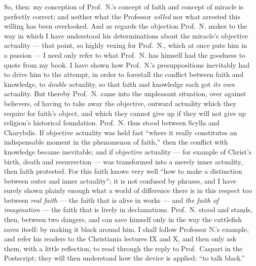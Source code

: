 \documentclass[12pt,a4paper]{book}
\begin{document}
So, then: my conception of Prof.\ N.'s concept of faith and concept of miracle
is perfectly correct; and neither what the Professor \emph{willed} nor what
arrested this willing has been overlooked. And as regards the objection Prof.\
N. makes to the way in which I have understood his determinations about the
miracle's objective actuality --- that point, so highly vexing for Prof.\ N.,
which at once puts him in a passion --- I need only refer to what Prof.\ N. has
himself had the goodness to quote from my book. I have shown how Prof.\ N.'s
presuppositions inevitably had to drive him to the attempt, in order to
forestall the conflict between faith and knowledge, to \emph{double} actuality,
so that faith and knowledge each got \emph{its own} actuality. But thereby
Prof.\ N. came into the unpleasant situation, over against believers, of having
to take away the objective, outward actuality which they require for faith's
object, and which they cannot give up if they will not give up religion's
historical foundation. Prof.\ N. thus stood between Scylla and Charybdis. If
objective actuality was held fast ``where it really constitutes an
indispensable moment in the phenomenon of faith,'' then the conflict with
knowledge became inevitable; and if objective actuality --- for example of
Christ's birth, death and resurrection --- was transformed into a merely inner
actuality, then faith protested. For this faith knows very well ``how to make a
distinction between outer and inner actuality''; it is not confused by phrases,
and I have surely shown plainly enough what a world of difference there is in
this respect too between \emph{real faith} --- the faith that is alive in works
--- and \emph{the faith of imagination} --- the faith that is lively in
declamations. Prof.\ N. stood and stands, then, between two dangers, and can
save himself only in the way the cuttlefish saves itself: by making it black
around him. I shall follow Professor N.'s example, and refer his readers to the
Christiania
lectures IX and X, and then only ask them, with a little reflection, to read
through the reply to Prof.\ Caspari in the Postscript; they will then
understand how the device is applied: ``to talk black.''
\end{document}
